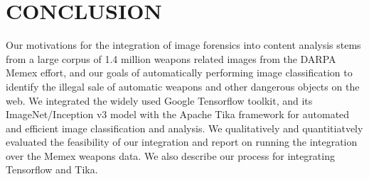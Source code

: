 \section{CONCLUSION} \label{sec:future}
Our motivations for the integration of image forensics into content analysis stems from a large corpus of 1.4 million weapons related images from the DARPA Memex effort, and our goals of automatically performing image classification to identify the illegal sale of automatic weapons and other dangerous objects on the web. We integrated the widely used Google Tensorflow toolkit, and its ImageNet/Inception v3 model with the Apache Tika framework for automated and efficient image classification and analysis. We qualitatively and quantitiatvely evaluated the feasibility of our integration and report on running the integration over the Memex weapons data. We also describe our process for integrating Tensorflow and Tika. 
